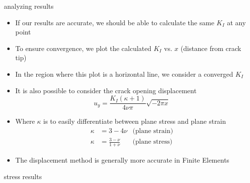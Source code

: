 \documentclass[10pt]{beamer}
\begin{document}
	\begin{frame}{analyzing results}
		\begin{itemize}[<+->]
			\item If our results are accurate, we should be able to calculate the same $K_I$ at any point
			\item To ensure convergence, we plot the calculated $K_I$ vs. $x$ (distance from crack tip)
			\item In the region where this plot is a horizontal line, we consider a converged $K_I$
			\item It is also possible to consider the crack opening displacement
			\begin{equation*}
			u_y = \frac{K_I(\kappa + 1)}{4 \nu \pi}\sqrt{-2 \pi x}
			\end{equation*}
			\item Where $\kappa$ is to easily differentiate between plane stress and plane strain
			\begin{align*}
			\kappa &= 3 - 4\nu & \text{(plane strain)}\\
			\kappa &= \frac{3-\nu}{1+\nu} & \text{(plane stress)}
			\end{align*}
			\item The displacement method is generally more accurate in Finite Elements
		\end{itemize}
	\end{frame}
	
	\begin{frame}{stress results}
	\end{frame}
	
\end{document}
